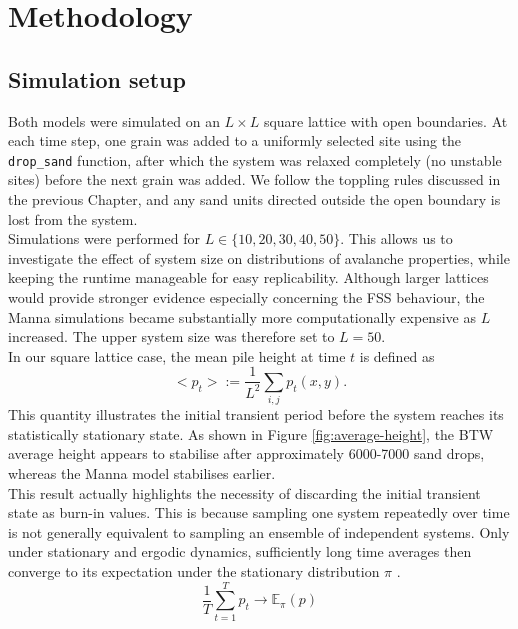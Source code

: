 \chapter{Methodology}\label{ch:methodology}

\section{Simulation setup}\label{sec:setup}

Both models were simulated on an $L \times L$ square lattice with open boundaries. At each time step, one grain was added to a uniformly selected site using the \texttt{drop\_sand} function, after which the system was relaxed completely (no unstable sites) before the next grain was added. We follow the toppling rules discussed in the previous Chapter, and any sand units directed outside the open boundary is lost from the system.\\

Simulations were performed for $L\in\{10,20,30,40,50\}$. This allows us to investigate the effect of system size on distributions of avalanche properties, while keeping the runtime manageable for easy replicability. Although larger lattices would provide stronger evidence especially concerning the FSS behaviour, the Manna simulations became substantially more computationally expensive as $L$ increased. The upper system size was therefore set to $L=50$.\\

In our square lattice case, the mean pile height at time $t$ is defined as
\[
<p_t>
:=
\frac{1}{L^2}\sum_{i,j}p_t(x,y).
\]
This quantity illustrates the initial transient period before the system reaches its statistically stationary state. As shown in Figure \ref{fig:average-height}, the BTW average height appears to stabilise after approximately 6000-7000 sand drops, whereas the Manna model stabilises earlier. \\

This result actually highlights the necessity of discarding the initial transient state as burn-in values. This is because sampling one system repeatedly over time is not generally equivalent to sampling an ensemble of independent systems. Only under stationary and ergodic dynamics, sufficiently long time averages then converge to its expectation under the stationary distribution $\pi$ \cite{ergodicity2021}.
\[
\frac{1}{T} \sum_{t=1}^T p_t \rightarrow \mathbb{E}_{\pi}(p)
\]

